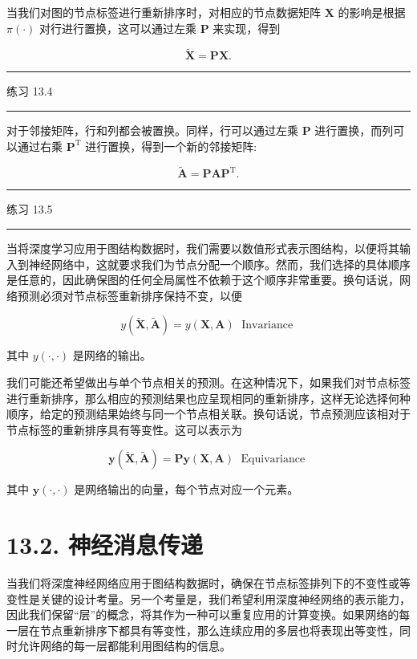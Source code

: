 \documentclass[10pt]{article}
\newcommand{\HRule}{\begin{center}\rule{0.9\linewidth}{0.2mm}\end{center}}
\begin{document}
当我们对图的节点标签进行重新排序时，对相应的节点数据矩阵 \(\mathbf{X}\) 的影响是根据 \(\pi \left( \cdot \right)\) 对行进行置换，这可以通过左乘 \(\mathbf{P}\) 来实现，得到

\[
\widetilde{\mathbf{X}} = \mathbf{{PX}}. \tag{13.4}
\]

\HRule

练习 13.4

\HRule

对于邻接矩阵，行和列都会被置换。同样，行可以通过左乘 \(\mathbf{P}\) 进行置换，而列可以通过右乘 \({\mathbf{P}}^{\mathrm{T}}\) 进行置换，得到一个新的邻接矩阵:

\[
\widetilde{\mathbf{A}} = {\mathbf{{PAP}}}^{\mathrm{T}}. \tag{13.5}
\]

\HRule

练习 13.5

\HRule

当将深度学习应用于图结构数据时，我们需要以数值形式表示图结构，以便将其输入到神经网络中，这就要求我们为节点分配一个顺序。然而，我们选择的具体顺序是任意的，因此确保图的任何全局属性不依赖于这个顺序非常重要。换句话说，网络预测必须对节点标签重新排序保持不变，以便

\[
y\left( {\widetilde{\mathbf{X}},\widetilde{\mathbf{A}}}\right)  = y\left( {\mathbf{X},\mathbf{A}}\right) \;\text{ Invariance } \tag{13.6}
\]

其中 \(y\left( {\cdot , \cdot  }\right)\) 是网络的输出。

我们可能还希望做出与单个节点相关的预测。在这种情况下，如果我们对节点标签进行重新排序，那么相应的预测结果也应呈现相同的重新排序，这样无论选择何种顺序，给定的预测结果始终与同一个节点相关联。换句话说，节点预测应该相对于节点标签的重新排序具有等变性。这可以表示为

\[
\mathbf{y}\left( {\widetilde{\mathbf{X}},\widetilde{\mathbf{A}}}\right)  = \mathbf{P}\mathbf{y}\left( {\mathbf{X},\mathbf{A}}\right) \;\text{ Equivariance } \tag{13.7}
\]

其中 \(\mathbf{y}\left( {\cdot , \cdot  }\right)\) 是网络输出的向量，每个节点对应一个元素。

\section*{13.2. 神经消息传递}

当我们将深度神经网络应用于图结构数据时，确保在节点标签排列下的不变性或等变性是关键的设计考量。另一个考量是，我们希望利用深度神经网络的表示能力，因此我们保留“层”的概念，将其作为一种可以重复应用的计算变换。如果网络的每一层在节点重新排序下都具有等变性，那么连续应用的多层也将表现出等变性，同时允许网络的每一层都能利用图结构的信息。
\end{document}
